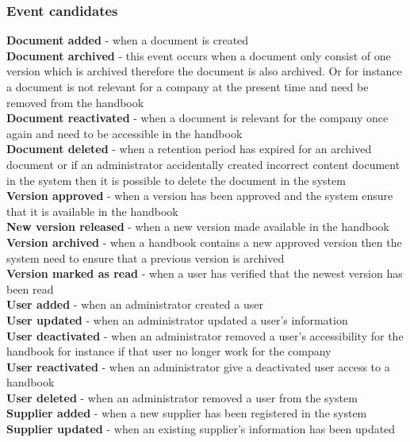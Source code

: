 \subsubsection{Event candidates}
\textbf{Document added} - when a document is created\\
\textbf{Document archived} - this event occurs when a document only consist of one version which is archived therefore the document is also archived. Or for instance a document is not relevant for a company at the present time and need be removed from the handbook\\
\textbf{Document reactivated} - when a document is relevant for the company once again and need to be accessible in the handbook\\
\textbf{Document deleted} - when a retention period has expired for an archived document or if an administrator accidentally created incorrect content document in the system then it is possible to delete the document in the system\\
\textbf{Version approved}  - when a version has been approved and the system ensure that it is available in the handbook\\ 
\textbf{New version released} -  when a new version made available in the handbook\\
\textbf{Version archived} - when a handbook contains a new approved version then the system need to ensure that a previous version is archived\\
\textbf{Version marked as read} - when a user has verified that the newest version has been read\\
\textbf{User added} - when an administrator created a user\\
\textbf{User updated} - when an administrator updated a user's information\\
\textbf{User deactivated} - when an administrator removed a user's accessibility for the handbook for instance if that user no longer work for the company\\
\textbf{User reactivated} - when an administrator give a deactivated user access to a handbook\\
\textbf{User deleted} - when an administrator removed a user from the system\\
\textbf{Supplier added} - when a new supplier has been registered in the system\\
\textbf{Supplier updated} - when an existing supplier's information has been updated\\

